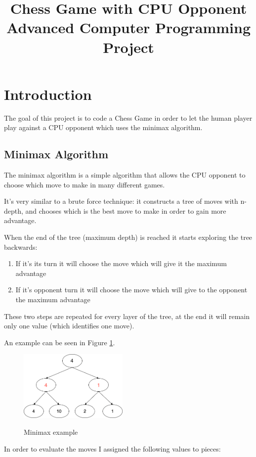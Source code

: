 \documentclass[english]{article}
\title{%
  Chess Game with CPU Opponent \\
  \large Advanced Computer Programming Project}
\begin{document}
\maketitle

\section{Introduction}
The goal of this project is to code a Chess Game in order to let the human player play against a CPU opponent which uses the minimax algorithm.

\subsection{Minimax Algorithm}
The minimax algorithm is a simple algorithm that allows the CPU opponent to choose which move to make in many different games.

It's very similar to a brute force technique: it constructs a tree of moves with n-depth, and chooses which is the best move to make in order to gain more advantage.

When the end of the tree (maximum depth) is reached it starts exploring the tree backwards:
\begin{enumerate}
	\item If it's its turn it will choose the move which will give it the maximum advantage
	\item If it's opponent turn it will choose the move which will give to the opponent the maximum advantage
\end{enumerate}

These two steps are repeated for every layer of the tree, at the end it will remain only one value (which identifies one move).

An example can be seen in Figure \ref{fig:minimax}.

\begin{figure}
 	\centering
  	\includegraphics[width=200px]{img/minimax.png}
 	 \label{fig:minimax}
 	 \caption{Minimax example}
\end{figure}

In order to evaluate the moves I assigned the following values to pieces:
\end{document}
